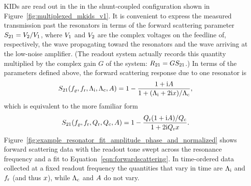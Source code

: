 KIDs are read out in the in the shunt-coupled configuration shown in Figure~\ref{fig:multiplexed_mkids_v1}.
It is convenient to express the measured transmission past the resonators in terms of the forward scattering parameter
$S_{21} = V_2 / V_1$,
where $V_1$ and $V_2$ are the complex voltages on the feedline of, respectively, the wave propagating toward the resonators and the wave arriving at the low-noise amplifier.
(The readout system actually records this quantity multiplied by the complex gain $G$ of the system:
$R_{21} = G S_{21}$.)
In terms of the parameters defined above, the forward scattering response due to one resonator is
\begin{equation}
S_{21}(f_\varrho, f_{\mathrm{r}}, \Lambda_{\mathrm{i}}, \Lambda_{\mathrm{c}}, A)
  =
  1 - \frac{1 + \mathrm{i} A}{1 + (\Lambda_{\mathrm{i}} + 2 \mathrm{i} x) / \Lambda_{\mathrm{c}}},
\label{eqn:forwardscattering}
\end{equation}
which is equivalent to the more familiar form~\autocite{Zmuidzinas2012ARCMP}
\begin{equation}
S_{21}(f_\varrho, f_{\mathrm{r}}, Q_{\mathrm{r}}, Q_{\mathrm{c}}, A)
  =
  1 - \frac{Q_{\mathrm{r}} (1 + \mathrm{i} A) / Q_{\mathrm{c}}}{1 + 2 \mathrm{i} Q_{\mathrm{r}} x}.
\end{equation}
Figure~\ref{fig:example_resonator_fit_amplitude_phase_and_normalized} shows forward scattering data with the readout tone swept across the resonance frequency and a fit to Equation~\ref{eqn:forwardscattering}.
In time-ordered data collected at a fixed readout frequency the quantities that vary in time are $\Lambda_{\mathrm{i}}$ and $f_{\mathrm{r}}$ (and thus $x$), while  
$\Lambda_{\mathrm{c}}$ and $A$ do not vary.

